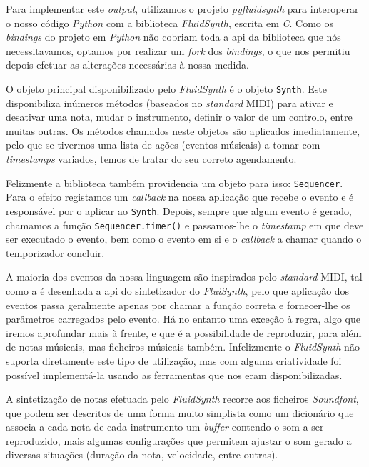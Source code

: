 Para implementar este \textit{output}, utilizamos o projeto \textit{pyfluidsynth}\cite{pyfluidsynth} para interoperar o nosso código \textit{Python} com a biblioteca \textit{FluidSynth}, escrita em \textit{C}. Como os \textit{bindings} do projeto em \textit{Python} não cobriam toda a \acrshort{api} da biblioteca que nós necessitavamos, optamos por realizar um \textit{fork} dos \textit{bindings}, o que nos permitiu depois efetuar as alterações necessárias à nossa medida.

O objeto principal disponibilizado pelo \textit{FluidSynth} é o objeto \texttt{Synth}. Este disponibiliza inúmeros métodos (baseados no \textit{standard} MIDI) para ativar e desativar uma nota, mudar o instrumento, definir o valor de um controlo, entre muitas outras. Os métodos chamados neste objetos são aplicados imediatamente, pelo que se tivermos uma lista de ações (eventos músicais) a tomar com \textit{timestamps} variados, temos de tratar do seu correto agendamento.

Felizmente a biblioteca também providencia um objeto para isso: \texttt{Sequencer}.  Para o efeito registamos um \textit{callback} na nossa aplicação que recebe o evento e é responsável por o aplicar ao \texttt{Synth}. Depois, sempre que algum evento é gerado, chamamos a função \texttt{Sequencer.timer()} e passamos-lhe o \textit{timestamp} em que deve ser executado o evento, bem como o evento em si e o \textit{callback} a chamar quando o temporizador concluir.

A maioria dos eventos da nossa linguagem são inspirados pelo \textit{standard} MIDI, tal como a é desenhada a \acrshort{api} do sintetizador do \textit{FluiSynth}, pelo que aplicação dos eventos passa geralmente apenas por chamar a função correta e fornecer-lhe os parâmetros carregados pelo evento. Há no entanto uma exceção à regra, algo que iremos aprofundar mais à frente, e que é a possibilidade de reproduzir, para além de notas músicais, mas ficheiros músicais também. Infelizmente o \textit{FluidSynth} não suporta diretamente este tipo de utilização, mas com alguma criatividade foi possível implementá-la usando as ferramentas que nos eram disponibilizadas.

A sintetização de notas efetuada pelo \textit{FluidSynth} recorre aos ficheiros \textit{Soundfont}, que podem ser descritos de uma forma muito simplista como um dicionário que associa a cada nota de cada instrumento um \textit{buffer} contendo o som a ser reproduzido, mais algumas configurações que permitem ajustar o som gerado a diversas situações (duração da nota, velocidade, entre outras).

